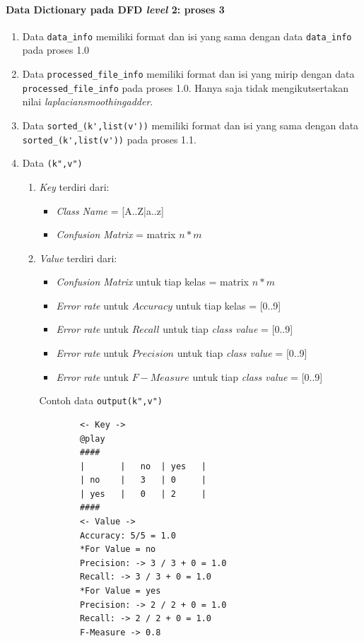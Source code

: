 \paragraph{Data Dictionary pada DFD \textit{level} 2: proses 3}
\begin{enumerate}
	\item Data \verb|data_info| memiliki format dan isi yang sama dengan data \verb|data_info| pada proses 1.0
	
	\item Data \verb|processed_file_info|
	memiliki format dan isi yang mirip dengan data \verb|processed_file_info| pada proses 1.0. Hanya saja tidak mengikutsertakan nilai \textit{laplaciansmoothingadder}.

	\item Data \verb|sorted_(k',list(v'))|
	memiliki format dan isi yang sama dengan data \verb|sorted_(k',list(v'))| pada proses 1.1.

	\item Data \verb|(k",v")|
	\begin{enumerate}
		\item \textit{Key} terdiri dari:
		\begin{itemize}
			\item \textit{Class Name} = [A..Z|a..z]
			\item \textit{Confusion Matrix} = matrix $n*m$
		\end{itemize}

		\item \textit{Value} terdiri dari:
		\begin{itemize}
			\item \textit{Confusion Matrix} untuk tiap kelas = matrix $n*m$
			\item \textit{Error rate} untuk $Accuracy$ untuk tiap kelas = [0..9]
			\item \textit{Error rate} untuk $Recall$ untuk tiap \textit{class value} = [0..9]
			\item \textit{Error rate} untuk $Precision$ untuk tiap \textit{class value} = [0..9]
			\item \textit{Error rate} untuk $F-Measure$ untuk tiap \textit{class value} = [0..9]
		\end{itemize}
		Contoh data \verb|output(k",v")|
		\begin{lstlisting}
		<- Key ->
		@play
		####
		|		|	no	| yes	|
		| no	|	3	| 0		|
		| yes	|	0	| 2		|
		####
		<- Value ->
		Accuracy: 5/5 = 1.0
		*For Value = no
		Precision: -> 3 / 3 + 0 = 1.0
		Recall: -> 3 / 3 + 0 = 1.0 
		*For Value = yes
		Precision: -> 2 / 2 + 0 = 1.0
		Recall: -> 2 / 2 + 0 = 1.0
		F-Measure -> 0.8
		\end{lstlisting}
	\end{enumerate}

\end{enumerate}

